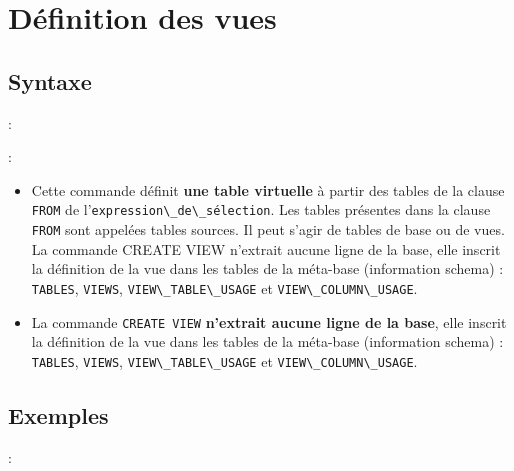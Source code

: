 \documentclass[10pt]{beamer}
\begin{document}
\section{Définition des vues}
\subsection{Syntaxe}
\begin{frame}{\secname : \subsecname}
    
\end{frame}

\begin{frame}{\secname : \subsecname}
    \begin{itemize}
        \item Cette commande définit \textbf{une table virtuelle} à partir des tables de la clause \lstinline[language=plsql]!FROM! de l'\lstinline[language=bnf]!expression\_de\_sélection!.  Les tables présentes dans la clause \lstinline[language=plsql]!FROM! sont appelées tables sources.  Il peut s'agir de tables de base ou de vues.
              La commande CREATE VIEW n'extrait aucune ligne de la base, elle inscrit la définition de la vue dans les tables de la méta-base (information schema) : \lstinline[language=plsql]!TABLES!, \lstinline[language=plsql]!VIEWS!, \lstinline[language=plsql]!VIEW\_TABLE\_USAGE! et \lstinline[language=plsql]!VIEW\_COLUMN\_USAGE!.
        \item La commande \lstinline[language=plsql]!CREATE VIEW! \textbf{n'extrait aucune ligne de la base}, elle inscrit la définition de la vue dans les tables de la méta-base (information schema) : \lstinline[language=plsql]!TABLES!, \lstinline[language=plsql]!VIEWS!, \lstinline[language=plsql]!VIEW\_TABLE\_USAGE! et \lstinline[language=plsql]!VIEW\_COLUMN\_USAGE!.
    \end{itemize}
\end{frame}

\subsection{Exemples}
\begin{frame}{\secname : \subsecname}
    
\end{frame}
\end{document}
